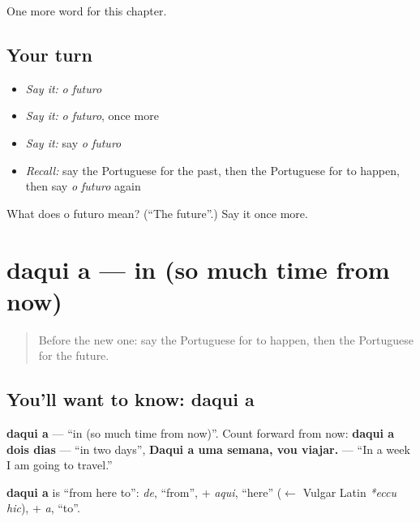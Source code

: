 \begin{grammarlens}[title={What you've built}]
One more word for this chapter.
\end{grammarlens}

\subsection*{Your turn}
\begin{itemize}
\raggedright
  \item \emph{Say it:} \emph{o futuro}
  \item \emph{Say it:} \emph{o futuro}, once more
  \item \emph{Say it:} say \emph{o futuro}
  \item \emph{Recall:} say the Portuguese for the past, then the Portuguese for to happen, then say \emph{o futuro} again
\end{itemize}

\begin{tcolorbox}[breakable,colback=teal!4,colframe=teal!35!black,title={Before you move on}]
What does o futuro mean? (\textquotedblleft{}The future\textquotedblright{}.) Say it once more.
\end{tcolorbox}
\section[daqui a]{daqui a — in (so much time from now)}

\label{lesson:PT-C136-daqui-a}



\begin{quote}
Before the new one: say the Portuguese for to happen, then the Portuguese for the future.
\end{quote}

\subsection*{You'll want to know: daqui a}
\textbf{daqui a} — \textquotedblleft{}in (so much time from now)\textquotedblright{}. Count forward from now: \textbf{daqui a dois dias} — \textquotedblleft{}in two days\textquotedblright{}, \textbf{Daqui a uma semana, vou viajar.} — \textquotedblleft{}In a week I am going to travel.\textquotedblright{}

\begin{cousinweb}
\textbf{daqui a} is \textquotedblleft{}from here to\textquotedblright{}: \emph{de}, \textquotedblleft{}from\textquotedblright{}, + \emph{aqui}, \textquotedblleft{}here\textquotedblright{} ($\leftarrow$ Vulgar Latin \emph{*eccu hic}), + \emph{a}, \textquotedblleft{}to\textquotedblright{}.
\end{cousinweb}

